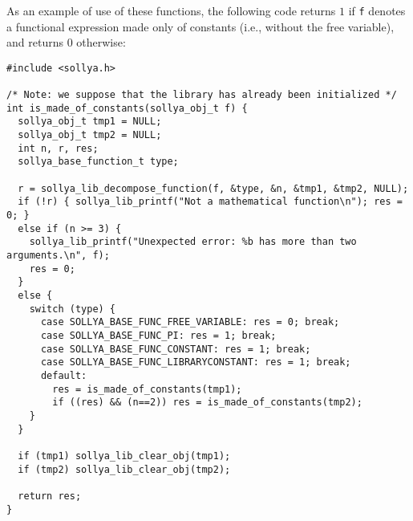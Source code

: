 \documentclass[a4paper]{article}
\begin{document}
As an example of use of these functions, the following code returns $1$ if \texttt{f} denotes a functional expression made only of constants (i.e., without the free variable), and returns $0$ otherwise:

\begin{center}\begin{minipage}{15cm}\begin{Verbatim}[frame=single]
#include <sollya.h>

/* Note: we suppose that the library has already been initialized */
int is_made_of_constants(sollya_obj_t f) {
  sollya_obj_t tmp1 = NULL;
  sollya_obj_t tmp2 = NULL;
  int n, r, res;
  sollya_base_function_t type;

  r = sollya_lib_decompose_function(f, &type, &n, &tmp1, &tmp2, NULL);
  if (!r) { sollya_lib_printf("Not a mathematical function\n"); res = 0; }
  else if (n >= 3) {
    sollya_lib_printf("Unexpected error: %b has more than two arguments.\n", f);
    res = 0;
  }
  else {
    switch (type) {
      case SOLLYA_BASE_FUNC_FREE_VARIABLE: res = 0; break;
      case SOLLYA_BASE_FUNC_PI: res = 1; break;
      case SOLLYA_BASE_FUNC_CONSTANT: res = 1; break;
      case SOLLYA_BASE_FUNC_LIBRARYCONSTANT: res = 1; break;
      default:
        res = is_made_of_constants(tmp1);
        if ((res) && (n==2)) res = is_made_of_constants(tmp2);
    }
  }

  if (tmp1) sollya_lib_clear_obj(tmp1);
  if (tmp2) sollya_lib_clear_obj(tmp2);

  return res;
}
\end{Verbatim}
\end{minipage}\end{center}
\end{document}
